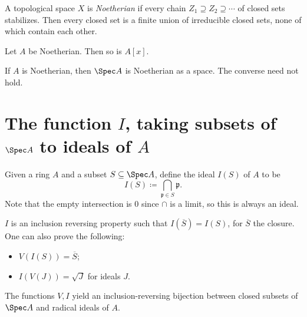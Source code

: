 A topological space $X$ is \emph{Noetherian} if every chain $Z_1 \supseteq Z_2 \supseteq \cdots $ of closed sets stabilizes. Then every closed set is a finite union of irreducible closed sets, none of which contain each other.

\begin{theorem}[Hilbert]\label{thm:3-6-3}
	Let $A$ be Noetherian. Then so is $A[x]$.
\end{theorem}

If $A$ is Noetherian, then $\Spec A$ is Noetherian as a space. The converse need not hold.

\section{The function $I$, taking subsets of $\Spec A$ to ideals of $A$}

\begin{definition}\label{dfn:3-7-1}
	Given a ring $A$ and a subset $S\subseteq \Spec A$, define the ideal $I(S)$ of $A$ to be
	\[
		I(S) \coloneqq \bigcap_{\mathfrak{p} \in S} \mathfrak{p} 
	.\]
	Note that the empty intersection is $0$ since $\cap $ is a limit, so this is always an ideal.
\end{definition}

$I$ is an inclusion reversing property such that $I(\overline{S} )=I(S)$, for $\overline{S} $ the closure. One can also prove the following:
\begin{itemize}
	\item $V(I(S)) = \overline{S} $;
	\item $I(V(J)) = \sqrt{J} $ for ideals $J$.
\end{itemize}
\begin{theorem}\label{thm:3-7-2}
	The functions $V,I$ yield an inclusion-reversing bijection between closed subsets of $\Spec A$ and radical ideals of $A$.
\end{theorem}

